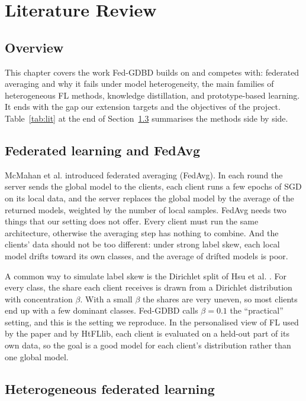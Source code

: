 \chapter{Literature Review}
\label{ch:lit}

\section{Overview}

This chapter covers the work Fed-GDBD builds on and competes with: federated averaging and why it fails under model heterogeneity, the main families of heterogeneous FL methods, knowledge distillation, and prototype-based learning. It ends with the gap our extension targets and the objectives of the project. Table~\ref{tab:lit} at the end of Section~\ref{sec:htfl} summarises the methods side by side.

\section{Federated learning and FedAvg}

McMahan et al. \cite{mcmahan2017fedavg} introduced federated averaging (FedAvg). In each round the server sends the global model to the clients, each client runs a few epochs of SGD on its local data, and the server replaces the global model by the average of the returned models, weighted by the number of local samples. FedAvg needs two things that our setting does not offer. Every client must run the same architecture, otherwise the averaging step has nothing to combine. And the clients' data should not be too different: under strong label skew, each local model drifts toward its own classes, and the average of drifted models is poor.

A common way to simulate label skew is the Dirichlet split of Hsu et al. \cite{hsu2019noniid}. For every class, the share each client receives is drawn from a Dirichlet distribution with concentration $\beta$. With a small $\beta$ the shares are very uneven, so most clients end up with a few dominant classes. Fed-GDBD calls $\beta = 0.1$ the ``practical'' setting, and this is the setting we reproduce. In the personalised view of FL used by the paper and by HtFLlib, each client is evaluated on a held-out part of its own data, so the goal is a good model for each client's distribution rather than one global model.

\section{Heterogeneous federated learning}
\label{sec:htfl}

